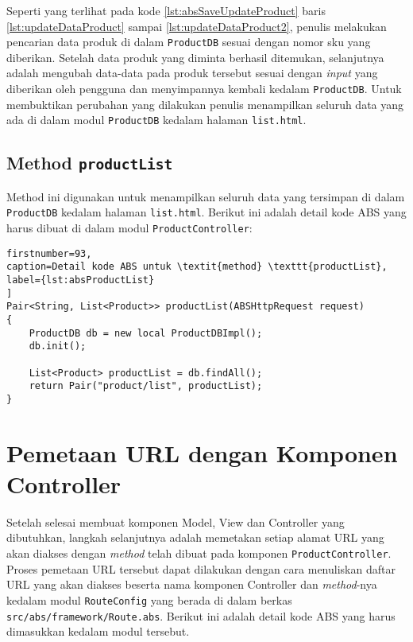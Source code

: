 Seperti yang terlihat pada kode \ref{lst:absSaveUpdateProduct} baris \ref{lst:updateDataProduct} sampai \ref{lst:updateDataProduct2}, penulis melakukan pencarian data produk di dalam \texttt{ProductDB} sesuai dengan nomor sku yang diberikan. Setelah data produk yang diminta berhasil ditemukan, selanjutnya adalah mengubah data-data pada produk tersebut sesuai dengan \textit{input} yang diberikan oleh pengguna dan menyimpannya kembali kedalam \texttt{ProductDB}. Untuk membuktikan perubahan yang dilakukan penulis menampilkan seluruh data yang ada di dalam modul \texttt{ProductDB} kedalam halaman \texttt{list.html}.

\subsection{Method \texttt{productList}}
Method ini digunakan untuk menampilkan seluruh data yang tersimpan di dalam \texttt{ProductDB} kedalam halaman \texttt{list.html}. Berikut ini adalah detail kode ABS yang harus dibuat di dalam modul \texttt{ProductController}:

\begin{lstlisting}
firstnumber=93,
caption=Detail kode ABS untuk \textit{method} \texttt{productList},
label={lst:absProductList}
]
Pair<String, List<Product>> productList(ABSHttpRequest request)
{
	ProductDB db = new local ProductDBImpl();
	db.init();
	
	List<Product> productList = db.findAll();
	return Pair("product/list", productList);
}
\end{lstlisting}

\section{Pemetaan URL dengan Komponen Controller}

Setelah selesai membuat komponen Model, View dan Controller yang dibutuhkan, langkah selanjutnya adalah memetakan setiap alamat URL yang akan diakses dengan \textit{method} telah dibuat pada komponen \texttt{ProductController}. Proses pemetaan URL tersebut dapat dilakukan dengan cara menuliskan daftar URL yang akan diakses beserta nama komponen Controller dan \textit{method}-nya kedalam modul \texttt{RouteConfig} yang berada di dalam berkas \texttt{src/abs/framework/Route.abs}. Berikut ini adalah detail kode ABS yang harus dimasukkan kedalam modul tersebut.


